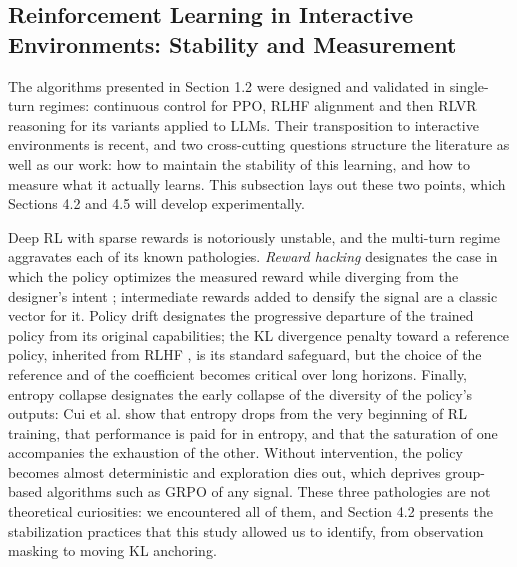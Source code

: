 \documentclass[11pt,a4paper]{article}
\begin{document}
\subsection{Reinforcement Learning in Interactive Environments: Stability and Measurement}

The algorithms presented in Section 1.2 were designed and validated in single-turn regimes: continuous control for PPO, RLHF alignment and then RLVR reasoning for its variants applied to LLMs. Their transposition to interactive environments is recent, and two cross-cutting questions structure the literature as well as our work: how to maintain the stability of this learning, and how to measure what it actually learns. This subsection lays out these two points, which Sections 4.2 and 4.5 will develop experimentally.

Deep RL with sparse rewards is notoriously unstable, and the multi-turn regime aggravates each of its known pathologies. \emph{Reward hacking} designates the case in which the policy optimizes the measured reward while diverging from the designer's intent \cite{skalse2022defining}; intermediate rewards added to densify the signal are a classic vector for it. Policy drift designates the progressive departure of the trained policy from its original capabilities; the KL divergence penalty toward a reference policy, inherited from RLHF \cite{ouyang2022training}, is its standard safeguard, but the choice of the reference and of the coefficient becomes critical over long horizons. Finally, entropy collapse designates the early collapse of the diversity of the policy's outputs: Cui et al. \cite{cui2025entropy} show that entropy drops from the very beginning of RL training, that performance is paid for in entropy, and that the saturation of one accompanies the exhaustion of the other. Without intervention, the policy becomes almost deterministic and exploration dies out, which deprives group-based algorithms such as GRPO of any signal. These three pathologies are not theoretical curiosities: we encountered all of them, and Section 4.2 presents the stabilization practices that this study allowed us to identify, from observation masking to moving KL anchoring.
\end{document}
